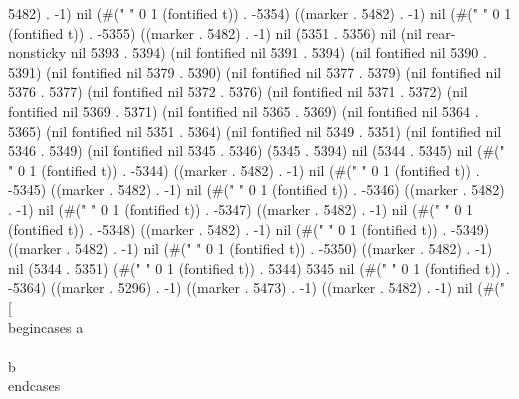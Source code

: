 5482) . -1) nil (#(" " 0 1 (fontified t)) . -5354) ((marker . 5482) . -1) nil (#(" " 0 1 (fontified t)) . -5355) ((marker . 5482) . -1) nil (5351 . 5356) nil (nil rear-nonsticky nil 5393 . 5394) (nil fontified nil 5391 . 5394) (nil fontified nil 5390 . 5391) (nil fontified nil 5379 . 5390) (nil fontified nil 5377 . 5379) (nil fontified nil 5376 . 5377) (nil fontified nil 5372 . 5376) (nil fontified nil 5371 . 5372) (nil fontified nil 5369 . 5371) (nil fontified nil 5365 . 5369) (nil fontified nil 5364 . 5365) (nil fontified nil 5351 . 5364) (nil fontified nil 5349 . 5351) (nil fontified nil 5346 . 5349) (nil fontified nil 5345 . 5346) (5345 . 5394) nil (5344 . 5345) nil (#("
" 0 1 (fontified t)) . -5344) ((marker . 5482) . -1) nil (#(" " 0 1 (fontified t)) . -5345) ((marker . 5482) . -1) nil (#(" " 0 1 (fontified t)) . -5346) ((marker . 5482) . -1) nil (#(" " 0 1 (fontified t)) . -5347) ((marker . 5482) . -1) nil (#(" " 0 1 (fontified t)) . -5348) ((marker . 5482) . -1) nil (#(" " 0 1 (fontified t)) . -5349) ((marker . 5482) . -1) nil (#(" " 0 1 (fontified t)) . -5350) ((marker . 5482) . -1) nil (5344 . 5351) (#(" " 0 1 (fontified t)) . 5344) 5345 nil (#("
" 0 1 (fontified t)) . -5364) ((marker . 5296) . -1) ((marker . 5473) . -1) ((marker . 5482) . -1) nil (#(" \\[
  \\begin{cases}
   a\\\\
   b
  \\end{cases}
